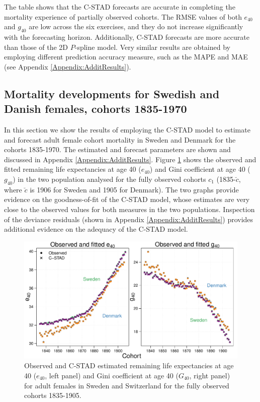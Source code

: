 \documentclass[11pt, a4paper]{article}
\begin{document}
The table shows that the C-STAD forecasts are accurate in completing the mortality experience of partially observed cohorts. The RMSE values of both $e_{40}$ and $g_{40}$  are low across the six exercises, and they do not increase significantly with the forecasting horizon. Additionally, C-STAD forecasts are more accurate than those of the 2D $P$-spline model. Very similar results are obtained by employing different prediction accuracy measure, such as the MAPE and MAE (see Appendix \ref{Appendix:AdditResults}). \par

\subsection{Mortality developments for Swedish and Danish females, cohorts 1835-1970}
\label{Subsec:ForecastC-STAD}
In this section we show the results of employing the C-STAD model to estimate and forecast adult female cohort mortality in Sweden and Denmark for the cohorts 1835-1970. The estimated and forecast parameters are  shown and discussed in Appendix \ref{Appendix:AdditResults}. Figure \ref{Fig:CSTADfitE40G40} shows the observed and fitted remaining life expectancies at age 40 ($e_{40}$) and Gini coefficient at age 40 ($g_{40}$) in the two population analysed for the fully observed cohorts $c_1$ (1835-$\breve{c}$, where $\breve{c}$ is 1906 for Sweden and 1905 for Denmark). The two graphs provide evidence on the goodness-of-fit of the C-STAD model, whose estimates are very close to the observed values for both measures in the two populations. Inspection of the deviance residuals (shown in Appendix \ref{Appendix:AdditResults}) provides additional evidence on the adequacy of the C-STAD model. \par

\begin{figure}[t]
	\begin{center}
		\includegraphics[scale=0.57]{./Figures/F4.pdf} 
		\caption{Observed and C-STAD estimated remaining life expectancies at age 40 ($e_{40}$, left panel) and Gini coefficient at age 40 ($G_{40}$, right panel) for adult females in Sweden and Switzerland for the fully observed cohorts 1835-1905.\label{Fig:CSTADfitE40G40}}    
	\end{center}
\end{figure}
\end{document}
